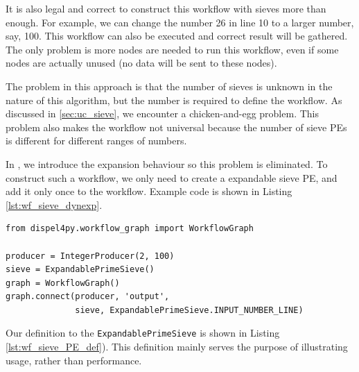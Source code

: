 It is also legal and correct to construct this workflow with sieves more than enough. For example, we can change the number 26 in line 10 to a larger number, say, 100. This workflow can also be executed and correct result will be gathered. The only problem is more nodes are needed to run this workflow, even if some nodes are actually unused (\ie no data will be sent to these nodes).

The problem in this approach is that the number of sieves is unknown in the nature of this algorithm, but the number is required to define the workflow. As discussed in \ref{sec:uc_sieve}, we encounter a chicken-and-egg problem. This problem also makes the workflow not universal because the number of sieve PEs is different for different ranges of numbers.

In \tdynexp, we introduce the expansion behaviour so this problem is eliminated. To construct such a workflow, we only need to create a expandable sieve PE, and add it only once to the workflow. Example code is shown in Listing \ref{lst:wf_sieve_dynexp}.

\begin{lstlisting}[frame=single,caption={Example code of the sieve workflow construction in the new semantics (suppose IntegerProducer and ExpandablePrimeSieve are already defined},captionpos=b,
label={lst:wf_sieve_dynexp}
]
from dispel4py.workflow_graph import WorkflowGraph

producer = IntegerProducer(2, 100)
sieve = ExpandablePrimeSieve()
graph = WorkflowGraph()
graph.connect(producer, 'output',
              sieve, ExpandablePrimeSieve.INPUT_NUMBER_LINE)
\end{lstlisting}

Our definition to the \lstinline|ExpandablePrimeSieve| is shown in Listing \ref{lst:wf_sieve_PE_def}). This definition mainly serves the purpose of illustrating usage, rather than performance.

